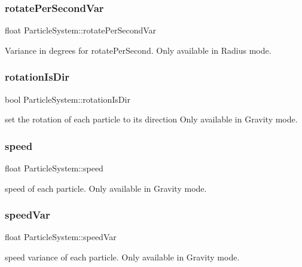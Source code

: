 \subsubsection{\texorpdfstring{rotate\+Per\+Second\+Var}{rotatePerSecondVar}}
{\footnotesize\ttfamily float Particle\+System\+::rotate\+Per\+Second\+Var}

Variance in degrees for rotate\+Per\+Second. Only available in \textquotesingle{}Radius\textquotesingle{} mode. \mbox{\label{classParticleSystem_a2a393acfe59bd8a950007b642e596849}} 
\subsubsection{\texorpdfstring{rotation\+Is\+Dir}{rotationIsDir}}
{\footnotesize\ttfamily bool Particle\+System\+::rotation\+Is\+Dir}

set the rotation of each particle to its direction Only available in \textquotesingle{}Gravity\textquotesingle{} mode. \mbox{\label{classParticleSystem_a1a4bba0d174d86e0a941b71c1d485b50}} 
\subsubsection{\texorpdfstring{speed}{speed}}
{\footnotesize\ttfamily float Particle\+System\+::speed}

speed of each particle. Only available in \textquotesingle{}Gravity\textquotesingle{} mode. \mbox{\label{classParticleSystem_a6b25942f1c1d36f31433c52c042174c6}} 
\subsubsection{\texorpdfstring{speed\+Var}{speedVar}}
{\footnotesize\ttfamily float Particle\+System\+::speed\+Var}

speed variance of each particle. Only available in \textquotesingle{}Gravity\textquotesingle{} mode. \mbox{\label{classParticleSystem_ad3033aadd088e0d11192096f5ad66384}} 
